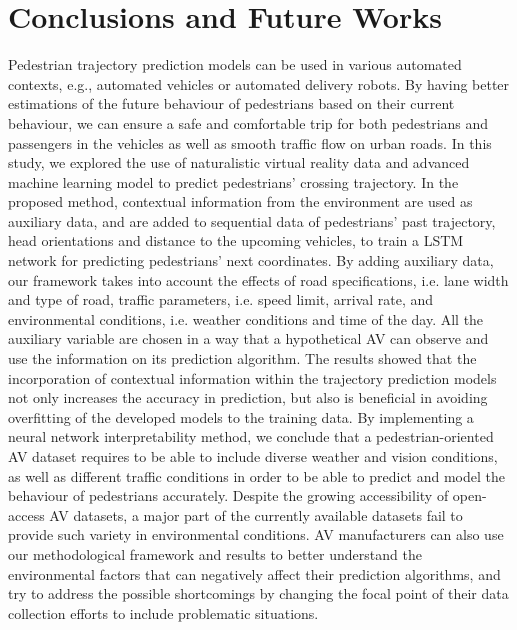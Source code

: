\section{Conclusions and Future Works}
\label{S:t6}
Pedestrian trajectory prediction models can be used in various automated contexts, e.g., automated vehicles or automated delivery robots. By having better estimations of the future behaviour of pedestrians based on their current behaviour, we can ensure a safe and comfortable trip for both pedestrians and passengers in the vehicles as well as smooth traffic flow on urban roads.
In this study, we explored the use of naturalistic virtual reality data and advanced machine learning model to predict pedestrians' crossing trajectory. In the proposed method, contextual information from the environment are used as auxiliary data, and are added to sequential data of pedestrians' past trajectory, head orientations and distance to the upcoming vehicles, to train a LSTM network for predicting pedestrians' next coordinates. By adding auxiliary data, our framework takes into account the effects of road specifications, i.e. lane width and type of road, traffic parameters, i.e. speed limit, arrival rate, and environmental conditions, i.e. weather conditions and time of the day. All the auxiliary variable are chosen in a way that a hypothetical AV can observe and use the information on its prediction algorithm. The results showed that the incorporation of contextual information within the trajectory prediction models not only increases the accuracy in prediction, but also is beneficial in avoiding overfitting of the developed models to the training data. By implementing a neural network interpretability method, we conclude that a pedestrian-oriented AV dataset requires to be able to include diverse weather and vision conditions, as well as different traffic conditions in order to be able to predict and model the behaviour of pedestrians accurately. Despite the growing accessibility of open-access AV datasets, a major part of the currently available datasets fail to provide such variety in environmental conditions. AV manufacturers can also use our methodological framework and results to better understand the environmental factors that can negatively affect their prediction algorithms, and try to address the possible shortcomings by changing the focal point of their data collection efforts to include problematic situations.   

